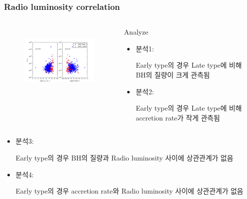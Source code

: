 \documentclass[xcolor={dvipsnames,table}]{beamer}
\newcommand\SM{\fontsize{8}{7.2}\selectfont}
\begin{document}
\begin{frame}
  \frametitle{Radio luminosity correlation}
  \SM
  \begin{columns}
   \begin{figure}
    \centering
    \includegraphics[width=6cm, height=3.5cm]{radiolum.png}
   \end{figure}
   \centering
   \begin{block}{Analyze}
    \begin{itemize}
     \item 분석1:
     
     Early type의 경우 Late type에 비해 BH의 질량이 크게 관측됨

     \vspace{0.2cm}
     \item 분석2:
     
     Early type의 경우 Late type에 비해 accretion rate가 작게 관측됨
    \end{itemize}
   \end{block}
  \end{columns}
  \vspace{0.2cm}
  \begin{itemize}
   \item 분석3:
   
   Early type의 경우 BH의 질량과 Radio luminosity 사이에 상관관계가 없음
   
   \item 분석4:
   
   Early type의 경우 accretion rate와 Radio luminosity 사이에 상관관계가 없음
  \end{itemize}
\end{frame}
\end{document}
